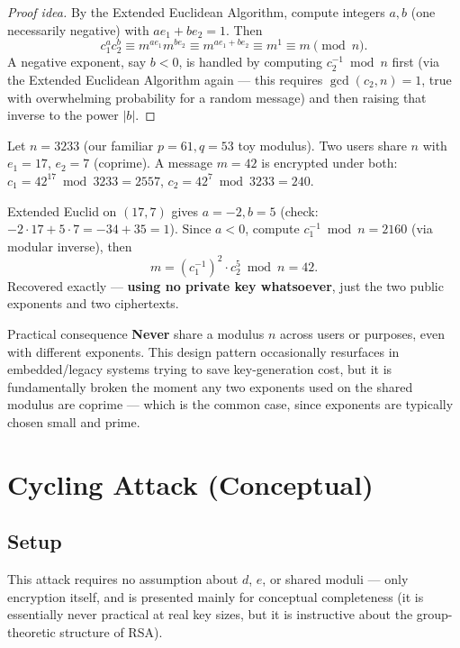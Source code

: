 \begin{proof}[Proof idea]
By the Extended Euclidean Algorithm, compute integers $a,b$ (one necessarily negative) with $a e_1 + b e_2 = 1$. Then
\[
c_1^{a} c_2^{b} \equiv m^{a e_1} m^{b e_2} \equiv m^{ae_1+be_2} \equiv m^{1} \equiv m \pmod n.
\]
A negative exponent, say $b<0$, is handled by computing $c_2^{-1} \bmod n$ first (via the Extended Euclidean Algorithm again — this requires $\gcd(c_2,n)=1$, true with overwhelming probability for a random message) and then raising that inverse to the power $|b|$.
\end{proof}

\begin{example}
Let $n = 3233$ (our familiar $p=61,q=53$ toy modulus). Two users share $n$ with $e_1 = 17$, $e_2=7$ (coprime). A message $m=42$ is encrypted under both: $c_1 = 42^{17} \bmod 3233 = 2557$, $c_2 = 42^{7} \bmod 3233 = 240$.

Extended Euclid on $(17,7)$ gives $a=-2, b=5$ (check: $-2\cdot17 + 5\cdot7 = -34+35=1$). Since $a<0$, compute $c_1^{-1} \bmod n = 2160$ (via modular inverse), then
\[
m = (c_1^{-1})^{2} \cdot c_2^{5} \bmod n = 42.
\]
Recovered exactly — \textbf{using no private key whatsoever}, just the two public exponents and two ciphertexts.
\end{example}

\begin{warnbox}{Practical consequence}
\textbf{Never} share a modulus $n$ across users or purposes, even with different exponents. This design pattern occasionally resurfaces in embedded/legacy systems trying to save key-generation cost, but it is fundamentally broken the moment any two exponents used on the shared modulus are coprime — which is the common case, since exponents are typically chosen small and prime.
\end{warnbox}

\newpage
\section{Cycling Attack (Conceptual)}

\subsection{Setup}
This attack requires no assumption about $d$, $e$, or shared moduli — only encryption itself, and is presented mainly for conceptual completeness (it is essentially never practical at real key sizes, but it is instructive about the group-theoretic structure of RSA).

